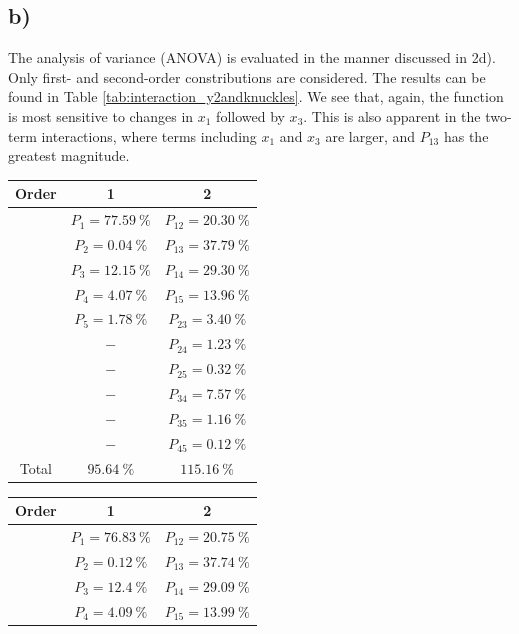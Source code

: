 \subsection*{b)}

The analysis of variance (ANOVA) is evaluated in the manner discussed in 2d). Only first- and second-order constributions are considered. The results can be found in Table \ref{tab:interaction_y2andknuckles}. We see that, again, the function is most sensitive to changes in $x_1$ followed by $x_3$. This is also apparent in the two-term interactions, where terms including $x_1$ and $x_3$ are larger, and $P_{13}$ has the greatest magnitude.

\begin{table}[h!]
	\centering
	\begin{tabular}{c|cc}
		Order &          1          &          2           \\
		\hline
		      & $P_{1} = 77.59\ \%$ & $P_{12} = 20.30\ \%$  \\
		      & $P_{2} = 0.04\ \%$  & $P_{13} = 37.79\ \%$ \\
		      & $P_{3} = 12.15\ \%$ & $P_{14} = 29.30\ \%$  \\
		      & $P_{4} = 4.07\ \%$  & $P_{15} = 13.96\ \%$ \\
		      & $P_{5} = 1.78\ \%$  & $P_{23} = 3.40\ \%$  \\
		      &         $-$         & $P_{24} = 1.23\ \%$  \\
		      &         $-$         & $P_{25} = 0.32\ \%$  \\
		      &         $-$         & $P_{34} = 7.57\ \%$  \\
		      &         $-$         & $P_{35} = 1.16\ \%$  \\
		      &         $-$         & $P_{45} = 0.12\ \%$  \\
		      \hline
		Total &     $95.64\ \%$     &     $115.16\ \%$     \\
	\end{tabular}
	\quad\quad\quad
	\begin{tabular}{c|cc}
		Order &          1          &          2           \\ \hline
		      & $P_{1} = 76.83\ \%$ & $P_{12} = 20.75\ \%$ \\
		      & $P_{2} = 0.12\ \%$  & $P_{13} = 37.74\ \%$ \\
		      & $P_{3} = 12.4\ \%$  & $P_{14} = 29.09\ \%$ \\
		      & $P_{4} = 4.09\ \%$  & $P_{15} = 13.99\ \%$ \\

\end{tabular}
\end{table}
